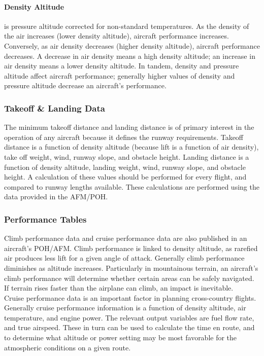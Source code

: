 \documentclass[12pt]{article}
\begin{document}
			\paragraph{Density Altitude} is pressure altitude corrected for non-standard temperatures. As the density of the air increases (lower density altitude), aircraft performance increases. Conversely, as air density decreases (higher density altitude), aircraft performance decreases. A decrease in air density means a high density altitude; an increase in air density means a lower density altitude.
			In tandem, density and pressure altitude affect aircraft performance; generally higher values of density and pressure altitude decrease an aircraft's performance.
		\subsubsection{Takeoff \& Landing Data}
			The minimum takeoff distance  and landing distance is of primary interest in the operation of any aircraft because it defines the runway requirements. Takeoff distance is a function of density altitude (because lift is a function of air density), take off weight, wind, runway slope, and obstacle height. Landing distance is a function of density altitude, landing weight, wind, runway slope, and obstacle height. A calculation of these values should be performed for every flight, and compared to runway lengths available. These calculations are performed using the data provided in the AFM/POH. 
		\subsubsection{Performance Tables}
			Climb performance data and cruise performance data are also published in an aircraft's POH/AFM. Climb performance is linked to density altitude, as rarefied air produces less lift for a given angle of attack. Generally climb performance diminishes as altitude increases. Particularly in mountainous terrain, an aircraft's climb performance will determine whether certain areas can be safely navigated. If terrain rises faster than the airplane can climb, an impact is inevitable. \\
			Cruise performance data is an important factor in planning cross-country flights. Generally cruise performance information is a function of density altitude, air temperature, and engine power. The relevant output variables are fuel flow rate, and true airspeed. These in turn can be used to calculate the time en route, and to determine what altitude or power setting may be most favorable for the atmospheric conditions on a given route.
\end{document}
